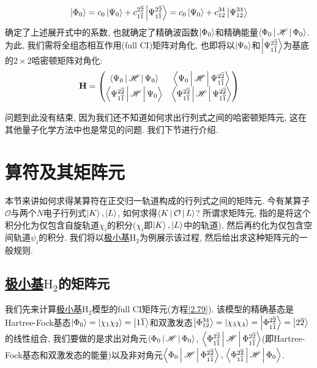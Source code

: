 \begin{equation}
\Ket{\Phi_0}=c_0\Ket{\Psi_0} + c_{1\overline{1}}^{2\overline{2}}\Ket{\Psi_{1\overline{1}}^{2\overline{2}}}=c_0\Ket{\Psi_0} + c_{12}^{34}\Ket{\Psi_{12}^{34}}
\end{equation}
确定了上述展开式中的系数, 也就确定了精确波函数$\Ket{\Phi_0}$和精确能量$\Braket{\Phi_0|\mathscr{H}|\Phi_0}$. 为此, 我们需将全组态相互作用(full CI)矩阵对角化, 也即将以$\Ket{\Psi_0}$和$\Ket{\Psi_{1\overline{1}}^{2\overline{2}}}$为基底的$2\times 2$哈密顿矩阵对角化:
\begin{equation}
	\label{2.79}
	\mathbf{H}=
	\begin{pmatrix}
		\Braket{{\Psi_0}|\mathscr{H} | {\Psi_0}} & \Braket{{\Psi_0} |\mathscr{H} |{\Psi_{1\overline{1}}^{2\overline{2}}}}\\
		\Braket{{\Psi_{1\overline{1}}^{2\overline{2}}}|\mathscr{H} | {\Psi_0}} & \Braket{{\Psi_{1\overline{1}}^{2\overline{2}}} |\mathscr{H} |{\Psi_{1\overline{1}}^{2\overline{2}}}}
	\end{pmatrix}
\end{equation}

问题到此没有结束, 因为我们还不知道如何求出行列式之间的哈密顿矩阵元, 这在其他量子化学方法中也是常见的问题. 我们下节进行介绍.

\section{算符及其矩阵元 }
 \label{sec2.3}
本节来讲如何求得某算符在正交归一轨道构成的行列式之间的矩阵元. 今有某算子$\mathcal{O}$与两个$N$电子行列式$\Ket{K},\Ket{L}$, 如何求得$\Braket{K|\mathcal{O}|L}$? 所谓求矩阵元, 指的是将这个积分化为仅包含自旋轨道$\chi_i$的积分($\chi_i$即$\Ket{K},\Ket{L}$中的轨道), 然后再约化为仅包含空间轨道$\psi_i$的积分.  我们将以\underline{极小基$\mathrm{H}_2$}为例展示该过程, 然后给出求这种矩阵元的一般规则.

\subsection{\underline{极小基$\mathrm{H}_2$}的矩阵元}
 \label{sec2.3.1}
我们先来计算\underline{极小基$\mathrm{H}_2$}模型的full CI矩阵元(方程\ref{2.79}). 该模型的精确基态是Hartree-Fock基态$\Ket{\Phi_0}=\Ket{\chi_1\chi_2}=\Ket{1\overline{1}}$和双激发态$\Ket{\Phi_{12}^{34}}=\Ket{\chi_3\chi_4}=\Ket{\Phi_{1\overline{1}}^{2\overline{2}}}=\Ket{2\overline{2}}$的线性组合, 我们要做的是求出对角元$\Braket{{\Phi_0}|\mathscr{H} | {\Phi_0}}$, $\Braket{{\Phi_{1\overline{1}}^{2\overline{2}}} |\mathscr{H} |{\Phi_{1\overline{1}}^{2\overline{2}}}}$(即Hartree-Fock基态和双激发态的能量)以及非对角元$\Braket{{\Phi_0} |\mathscr{H} |{\Phi_{1\overline{1}}^{2\overline{2}}}},$$\,\Braket{{\Phi_{1\overline{1}}^{2\overline{2}}}|\mathscr{H} | {\Phi_0}}$.

